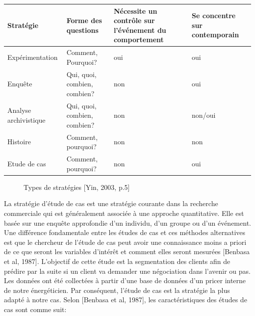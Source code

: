 \documentclass[12pt]{article}
\begin{document}
{\begin{center}
\begin{tabular}{|p{3cm}|p{4cm}|p{4cm}|p{4cm}|}
\hline
   Stratégie& Forme des questions
 & Nécessite un contrôle sur l'événement du comportement &Se concentre sur contemporain \\
  \hline
   Expérimentation&Comment, Pourquoi? & oui &oui\\
  \hline
   Enquête&Qui, quoi, combien, combien?& non &oui\\
  \hline
 Analyse archivistique& Qui, quoi, combien, combien?  & non &non/oui\\
  \hline
   Histoire  &Comment, pourquoi?& non& non \\
    \hline
  Etude de cas  &Comment, pourquoi? & non & oui \\
    \hline
\end{tabular}
\end{center}
\begin{figure}[H]
	\centering
    
     \caption{Types de stratégies [Yin, 2003, p.5] }
    \label{fig:20}
\end{figure}


La stratégie d'étude de cas est une stratégie courante dans la recherche commerciale qui est généralement associée à une approche quantitative. Elle est basée sur une enquête approfondie d'un individu, d'un groupe ou d'un événement. Une différence fondamentale entre les études de cas et ces méthodes alternatives est que le chercheur de l'étude de cas peut avoir une connaissance moins a priori de ce que seront les variables d'intérêt et comment elles seront mesurées {\color{red}[Benbasa et al, 1987]}.
L'objectif de cette étude est la segmentation des clients afin de prédire par la suite si un client va demander une négociation dans l’avenir ou pas. Les données ont été collectées à partir d'une base de données d’un pricer interne de notre énergéticien. Par conséquent, l'étude de cas est la  stratégie la plus adapté à notre cas. Selon {\color{red}[Benbasa et al, 1987]}, les caractéristiques des études de cas sont comme suit:

}
\end{document}
